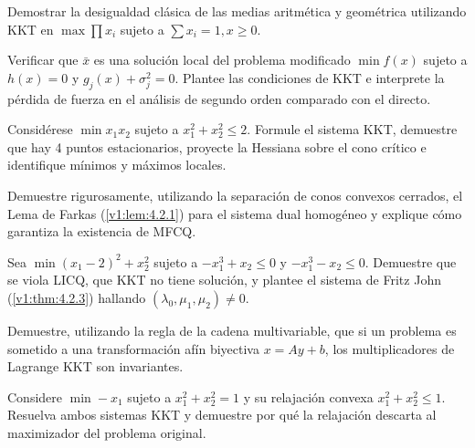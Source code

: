 \begin{exercise}\label{v1:ejer:4.3.5}
 Demostrar la desigualdad clásica de las medias aritmética y geométrica utilizando KKT en $\max \prod x_i$ sujeto a $\sum x_i = 1, x \ge 0$.
\end{exercise}

\begin{exercise}\label{v1:ejer:4.3.6}
 Verificar que $\bar{x}$ es una solución local del problema modificado $\min f(x)$ sujeto a $h(x) = 0$ y $g_j(x) + \sigma_j^2 = 0$. Plantee las condiciones de KKT e interprete la pérdida de fuerza en el análisis de segundo orden comparado con el directo.
\end{exercise}


\begin{exercise}\label{v1:ejer:kkt_x1x2}
 Considérese $\min x_1 x_2$ sujeto a $x_1^2 + x_2^2 \le 2$. Formule el sistema KKT, demuestre que hay 4 puntos estacionarios, proyecte la Hessiana sobre el cono crítico e identifique mínimos y máximos locales.
\end{exercise}

\begin{exercise}\label{v1:ejer:farkas_mfcq}
 Demuestre rigurosamente, utilizando la separación de conos convexos cerrados, el Lema de Farkas (\cref{v1:lem:4.2.1}) para el sistema dual homogéneo y explique cómo garantiza la existencia de MFCQ.
\end{exercise}

\begin{exercise}\label{v1:ejer:fritz_john_kkt}
 Sea $\min (x_1 - 2)^2 + x_2^2$ sujeto a $-x_1^3 + x_2 \le 0$ y $-x_1^3 - x_2 \le 0$. Demuestre que se viola LICQ, que KKT no tiene solución, y plantee el sistema de Fritz John (\cref{v1:thm:4.2.3}) hallando $(\lambda_0, \mu_1, \mu_2) \neq 0$.
\end{exercise}

\begin{exercise}\label{v1:ejer:kkt_afin}
 Demuestre, utilizando la regla de la cadena multivariable, que si un problema es sometido a una transformación afín biyectiva $x = Ay + b$, los multiplicadores de Lagrange KKT son invariantes.
\end{exercise}

\begin{exercise}\label{v1:ejer:relajacion_convexa}
 Considere $\min -x_1$ sujeto a $x_1^2 + x_2^2 = 1$ y su relajación convexa $x_1^2 + x_2^2 \le 1$. Resuelva ambos sistemas KKT y demuestre por qué la relajación descarta al maximizador del problema original.
\end{exercise}

